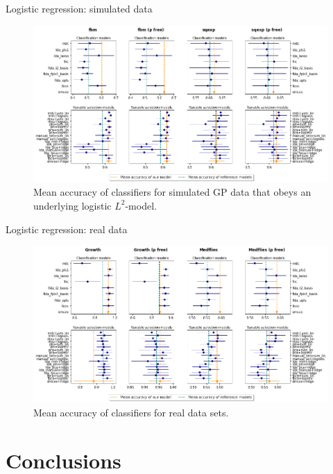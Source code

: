 \documentclass[10pt, english, professionalfonts]{beamer}
\begin{document}
\begin{frame}{Logistic regression: simulated data}
    \vspace{1em}
  \begin{figure}
    \includegraphics[width=\textwidth]{img/clf_emcee_l2}
    \caption{Mean accuracy of classifiers for simulated GP data that obeys an underlying logistic \(L^2\)-model.}
  \end{figure}
\end{frame}

\begin{frame}{Logistic regression: real data}
    \vspace{1em}
  \begin{figure}
    \includegraphics[width=\textwidth]{img/clf_emcee_real}
    \caption{Mean accuracy of classifiers for real data sets.}
  \end{figure}
\end{frame}


\section{Conclusions}
\end{document}
